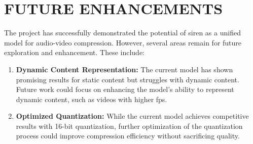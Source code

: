 \section{\MakeUppercase{Future Enhancements}}

The project has successfully demonstrated the potential of \gls{siren} as a unified model for audio-video compression. However, several areas remain for future exploration and enhancement. These include:

\begin{enumerate}[label=\textbf{\roman*.}]

    \item \textbf{Dynamic Content Representation:} The current model has shown promising results for static content but struggles with dynamic content. Future work could focus on enhancing the model's ability to represent dynamic content, such as videos with higher \gls{fps}.
    
    \item \textbf{Optimized Quantization:} While the current model achieves competitive results with 16-bit quantization, further optimization of the quantization process could improve compression efficiency without sacrificing quality.
    
\end{enumerate}